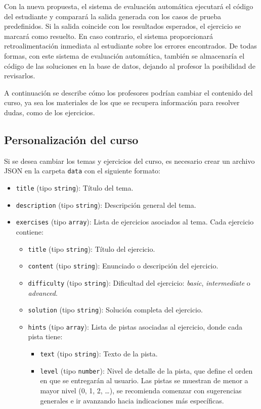 Con la nueva propuesta, el sistema de evaluación automática ejecutará el código del estudiante y comparará la salida generada con los casos de prueba predefinidos. Si la salida coincide con los resultados esperados, el ejercicio se marcará como resuelto. En caso contrario, el sistema proporcionará retroalimentación inmediata al estudiante sobre los errores encontrados. De todas formas, con este sistema de evaluación automática, también se almacenaría el código de las soluciones en la base de datos, dejando al profesor la posibilidad de revisarlos.

A continuación se describe cómo los profesores podrían cambiar el contenido del curso, ya sea los materiales de los que se recupera información para resolver dudas, como de los ejercicios.

\subsection{Personalización del curso}

Si se desea cambiar los temas y ejercicios del curso, es necesario crear un archivo JSON en la carpeta \texttt{data} con el siguiente formato:

\begin{itemize}
    \item \texttt{title} (tipo \texttt{string}): Título del tema.
    \item \texttt{description} (tipo \texttt{string}): Descripción general del tema.
    \item \texttt{exercises} (tipo \texttt{array}): Lista de ejercicios asociados al tema. Cada ejercicio contiene:
    \begin{itemize}
        \item \texttt{title} (tipo \texttt{string}): Título del ejercicio.
        \item \texttt{content} (tipo \texttt{string}): Enunciado o descripción del ejercicio.
        \item \texttt{difficulty} (tipo \texttt{string}): Dificultad del ejercicio: \textit{basic}, \textit{intermediate} o \textit{advanced}.
        \item \texttt{solution} (tipo \texttt{string}): Solución completa del ejercicio.
        \item \texttt{hints} (tipo \texttt{array}): Lista de pistas asociadas al ejercicio, donde cada pista tiene:
        \begin{itemize}
            \item \texttt{text} (tipo \texttt{string}): Texto de la pista.
            \item \texttt{level} (tipo \texttt{number}): Nivel de detalle de la pista, que define el orden en que se entregarán al usuario. Las pistas se muestran de menor a mayor nivel (0, 1, 2, \ldots), se recomienda comenzar con sugerencias generales e ir avanzando hacia indicaciones más específicas.
        \end{itemize}
    \end{itemize}
\end{itemize}

